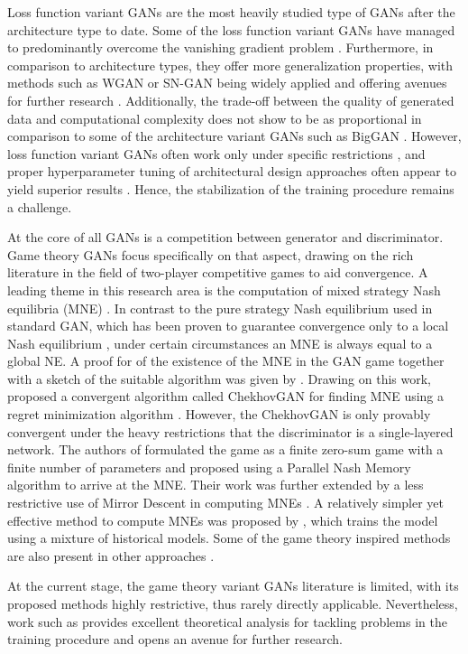 Loss function variant GANs are the most heavily studied type of GANs after the architecture type to date. Some of the loss function variant GANs have managed to predominantly overcome the vanishing gradient problem . Furthermore, in comparison to architecture types, they offer more generalization properties, with methods such as WGAN or SN-GAN being widely applied and offering avenues for further research . Additionally, the trade-off between the quality of generated data and computational complexity does not show to be as proportional in comparison to some of the architecture variant GANs such as BigGAN . However, loss function variant GANs often work only under specific restrictions , and proper hyperparameter tuning of architectural design approaches often appear to yield superior results . Hence, the stabilization of the training procedure remains a challenge.

At the core of all GANs is a competition between generator and discriminator. Game theory GANs focus specifically on that aspect, drawing on the rich literature in the field of two-player competitive games  to aid convergence.
A leading theme in this research area is the computation of mixed strategy Nash equilibria (MNE) . In contrast to the pure strategy Nash equilibrium used in standard GAN, which has been proven to guarantee convergence only to a local Nash equilibrium , under certain circumstances an MNE is always equal to a global NE. A proof for of the existence of the MNE in the GAN game together with a sketch of the suitable algorithm was given by . Drawing on this work,  proposed a convergent algorithm called ChekhovGAN for finding MNE using a regret minimization algorithm . However, the ChekhovGAN is only provably convergent under the heavy restrictions that the discriminator is a single-layered network. The authors of  formulated the game as a finite zero-sum game with a finite number of parameters and proposed using a Parallel Nash Memory algorithm  to arrive at the MNE. Their work was further extended by a less restrictive use of Mirror Descent in computing MNEs . A relatively simpler yet effective method to compute MNEs was proposed by , which trains the model using a mixture of historical models. Some of the game theory inspired methods are also present in other approaches .

At the current stage, the game theory variant GANs literature is limited, with its proposed methods highly restrictive, thus rarely directly applicable. Nevertheless, work such as  provides excellent theoretical analysis for tackling problems in the training procedure and opens an avenue for further research.

